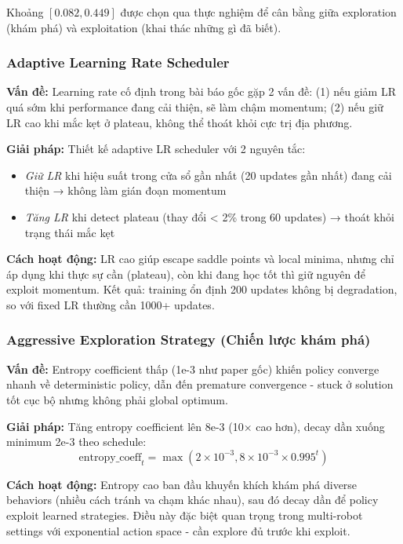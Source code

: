 Khoảng $[0.082, 0.449]$ được chọn qua thực nghiệm để cân bằng giữa exploration (khám phá) và exploitation (khai thác những gì đã biết).

\subsubsection{Adaptive Learning Rate Scheduler}

\textbf{Vấn đề:} Learning rate cố định trong bài báo gốc gặp 2 vấn đề: (1) nếu giảm LR quá sớm khi performance đang cải thiện, sẽ làm chậm momentum; (2) nếu giữ LR cao khi mắc kẹt ở plateau, không thể thoát khỏi cực trị địa phương.

\textbf{Giải pháp:} Thiết kế adaptive LR scheduler với 2 nguyên tắc:
\begin{itemize}[nosep]
\item \textit{Giữ LR} khi hiệu suất trong cửa sổ gần nhất (20 updates gần nhất) đang cải thiện → không làm gián đoạn momentum
\item \textit{Tăng LR} khi detect plateau (thay đổi < 2\% trong 60 updates) → thoát khỏi trạng thái mắc kẹt
\end{itemize}

\textbf{Cách hoạt động:} LR cao giúp escape saddle points và local minima, nhưng chỉ áp dụng khi thực sự cần (plateau), còn khi đang học tốt thì giữ nguyên để exploit momentum. Kết quả: training ổn định 200 updates không bị degradation, so với fixed LR thường cần 1000+ updates.

\subsubsection{Aggressive Exploration Strategy (Chiến lược khám phá)}

\textbf{Vấn đề:} Entropy coefficient thấp (1e-3 như paper gốc) khiến policy converge nhanh về deterministic policy, dẫn đến premature convergence - stuck ở solution tốt cục bộ nhưng không phải global optimum.

\textbf{Giải pháp:} Tăng entropy coefficient lên 8e-3 (10× cao hơn), decay dần xuống minimum 2e-3 theo schedule:
\begin{equation}
\text{entropy\_coeff}_t = \max(2 \times 10^{-3}, 8 \times 10^{-3} \times 0.995^t)
\end{equation}

\textbf{Cách hoạt động:} Entropy cao ban đầu khuyến khích khám phá diverse behaviors (nhiều cách tránh va chạm khác nhau), sau đó decay dần để policy exploit learned strategies. Điều này đặc biệt quan trọng trong multi-robot settings với exponential action space - cần explore đủ trước khi exploit.

